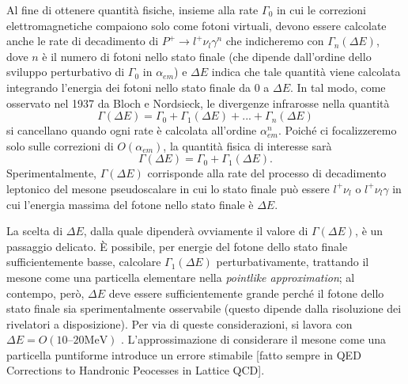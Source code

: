 \documentclass[LaM]{sapthesis}
\begin{document}
	Al fine di ottenere quantità fisiche, insieme alla rate $\Gamma_0$ in cui le correzioni elettromagnetiche compaiono solo come fotoni virtuali, devono essere calcolate anche le rate di decadimento di $P^+\to l^+\nu_l\gamma^n$ che indicheremo con $\Gamma_n(\Delta E)$, dove $n$ è il numero di fotoni nello stato finale (che dipende dall'ordine dello sviluppo perturbativo di $\Gamma_0$ in $\alpha_{em}$) e $\Delta E$ indica che tale quantità viene calcolata integrando l'energia dei fotoni nello stato finale da $0$ a $\Delta E$. In tal modo, come osservato nel 1937 da Bloch e Nordsieck, le divergenze infrarosse nella quantità
	$$
	\Gamma(\Delta E) = \Gamma_0 + \Gamma_1(\Delta E) + ... + \Gamma_n(\Delta E)
	$$
	si cancellano quando ogni rate è calcolata all'ordine $\alpha_{em}^n$. Poiché ci focalizzeremo solo sulle correzioni di $O(\alpha_{em})$, la quantità fisica di interesse sarà
	$$
	\Gamma(\Delta E) = \Gamma_0+\Gamma_1(\Delta E).
	$$
	Sperimentalmente, $\Gamma(\Delta E)$ corrisponde alla rate del processo di decadimento leptonico del mesone pseudoscalare in cui lo stato finale può essere $l^+\nu_l$ o $l^+\nu_l\gamma$ in cui l'energia massima del fotone nello stato finale è $\Delta E$.
	
	La scelta di $\Delta E$, dalla quale dipenderà ovviamente il valore di $\Gamma(\Delta E)$, è un passaggio delicato. È possibile, per energie del fotone dello stato finale sufficientemente basse, calcolare $\Gamma_1(\Delta E)$ perturbativamente, trattando il mesone come una particella elementare nella \emph{pointlike approximation}; al contempo, però, $\Delta E$ deve essere sufficientemente grande perché il fotone dello stato finale sia sperimentalmente osservabile (questo dipende dalla risoluzione dei rivelatori a disposizione). Per via di queste considerazioni, si lavora con 
	$\Delta E=O(\numrange{10}{20} \si{\mega\electronvolt})$
	. L'approssimazione di considerare il mesone come una particella puntiforme introduce un errore stimabile [\color{green}fatto sempre in QED Corrections to Handronic Peocesses in Lattice QCD\color{black}].
	
\end{document}
